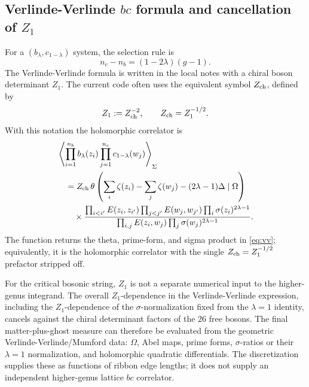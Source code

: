 \documentclass[11pt]{article}
\numberwithin{equation}{section}
\begin{document}
\subsection{\texorpdfstring{Verlinde-Verlinde \(bc\) formula and cancellation of \(Z_1\)}
{Verlinde-Verlinde bc formula and cancellation of Z1}}

For a \((b_\lambda,c_{1-\lambda})\) system, the selection rule is
\begin{equation}
        n_c-n_b=(1-2\lambda)(g-1).
        \label{eq:bcselection}
\end{equation}
The Verlinde-Verlinde formula is written in the local notes with a chiral
boson determinant \(Z_1\).  The current code often uses the equivalent symbol
\(Z_{\rm ch}\), defined by
\[
        Z_1:=Z_{\rm ch}^{-2},\qquad Z_{\rm ch}=Z_1^{-1/2}.
\]
With this notation the holomorphic correlator is
\begin{equation}
\begin{aligned}
&\left\langle
\prod_{i=1}^{n_b} b_\lambda(z_i)
\prod_{j=1}^{n_c} c_{1-\lambda}(w_j)
\right\rangle_{\Sigma}
\\
&\quad =
Z_{\rm ch}\,
\theta\left(
\sum_i\zeta(z_i)-\sum_j\zeta(w_j)-(2\lambda-1)\Delta
\mid \Omega
\right)
\\
&\qquad\times
\frac{
\prod_{i<i'}E(z_i,z_{i'})
\prod_{j<j'}E(w_j,w_{j'})
\prod_i\sigma(z_i)^{2\lambda-1}}
{\prod_{i,j}E(z_i,w_j)
\prod_j\sigma(w_j)^{2\lambda-1}}.
\end{aligned}
        \label{eq:vv}
\end{equation}
The function  returns the theta,
prime-form, and sigma product in \eqref{eq:vv}; equivalently, it is the
holomorphic correlator with the single \(Z_{\rm ch}=Z_1^{-1/2}\) prefactor
stripped off.

For the critical bosonic string, \(Z_1\) is not a separate numerical input to
the higher-genus integrand.  The overall \(Z_1\)-dependence in the
Verlinde-Verlinde expression, including the \(Z_1\)-dependence of the
\(\sigma\)-normalization fixed from the \(\lambda=1\) identity, cancels against
the chiral determinant factors of the \(26\) free bosons.  The final
matter-plus-ghost measure can therefore be evaluated from the geometric
Verlinde-Verlinde/Mumford data: \(\Omega\), Abel maps, prime forms,
\(\sigma\)-ratios or their \(\lambda=1\) normalization, and holomorphic
quadratic differentials.  The discretization supplies these as functions of
ribbon edge lengths; it does not supply an independent higher-genus lattice
\(bc\) correlator.
\end{document}
